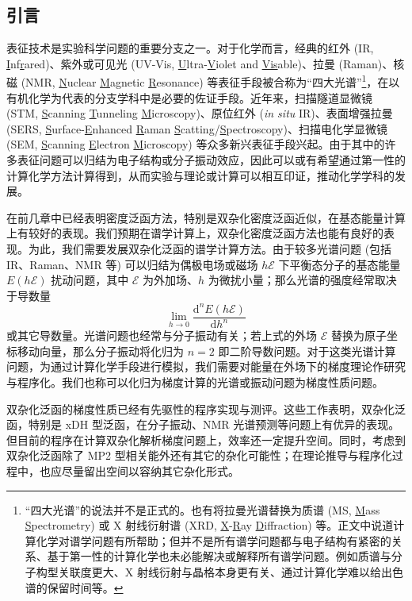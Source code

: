 \subsection{引言}

表征技术是实验科学问题的重要分支之一。对于化学而言，经典的红外 (IR, \underline{I}nf\underline{r}ared)、紫外或可见光 (UV-Vis, \underline{U}ltra-\underline{V}iolet and \underline{Vis}able)、拉曼 (Raman)、核磁 (NMR, \underline{N}uclear \underline{M}agnetic \underline{R}esonance) 等表征手段被合称为“四大光谱”\footnote{“四大光谱”的说法并不是正式的。也有将拉曼光谱替换为质谱 (MS, \underline{M}ass \underline{S}pectrometry) 或 X 射线衍射谱 (XRD, \underline{X}-\underline{R}ay \underline{D}iffraction) 等。正文中说道计算化学对谱学问题有所帮助；但并不是所有谱学问题都与电子结构有紧密的关系、基于第一性的计算化学也未必能解决或解释所有谱学问题。例如质谱与分子构型关联度更大、X 射线衍射与晶格本身更有关、通过计算化学难以给出色谱的保留时间等。}，在以有机化学为代表的分支学科中是必要的佐证手段。近年来，扫描隧道显微镜 (STM, \underline{S}canning \underline{T}unneling \underline{M}icroscopy)、原位红外 (\emph{in situ} IR)、表面增强拉曼 (SERS, \underline{S}urface-\underline{E}nhanced \underline{R}aman \underline{S}catting/\underline{S}pectroscopy)、扫描电化学显微镜 (SEM, \underline{S}canning \underline{E}lectron \underline{M}icroscopy) 等众多新兴表征手段兴起。由于其中的许多表征问题可以归结为电子结构或分子振动效应，因此可以或有希望通过第一性的计算化学方法计算得到，从而实验与理论或计算可以相互印证，推动化学学科的发展。

在前几章中已经表明密度泛函方法，特别是双杂化密度泛函近似，在基态能量计算上有较好的表现。我们预期在谱学计算上，双杂化密度泛函方法也能有良好的表现。为此，我们需要发展双杂化泛函的谱学计算方法。由于较多光谱问题 (包括 IR、Raman、NMR 等) 可以归结为偶极电场或磁场 $h \pmb{\mathcal{E}}$ 下平衡态分子的基态能量 $E(h \pmb{\mathcal{E}})$ 扰动问题，其中 $\pmb{\mathcal{E}}$ 为外加场、$h$ 为微扰小量；那么光谱的强度经常取决于导数量
\begin{equation}
  \lim_{h \rightarrow 0} \frac{\mathrm{d}^n E(h \pmb{\mathcal{E}})}{\mathrm{d} h^n}
\end{equation}
或其它导数量。光谱问题也经常与分子振动有关；若上式的外场 $\pmb{\mathcal{E}}$ 替换为原子坐标移动向量，那么分子振动将化归为 $n = 2$ 即二阶导数问题。对于这类光谱计算问题，为通过计算化学手段进行模拟，我们需要对能量在外场下的梯度理论作研究与程序化。我们也称可以化归为梯度计算的光谱或振动问题为\textsf{梯度性质}问题。

双杂化泛函的梯度性质已经有先驱性的程序实现与测评\cite{Neese-Grimme.JCP.2007, Biczysko-Barone.JCTC.2010, Su-Xu.JCC.2013, Stoychev-Neese.JCTC.2018, Gu-Xu.JCTC.2021, Yan-Xu.JCTC.2022}。这些工作表明，双杂化泛函，特别是 xDH 型泛函，在分子振动、NMR 光谱预测等问题上有优异的表现。但目前的程序在计算双杂化解析梯度问题上，效率还一定提升空间。同时，考虑到双杂化泛函除了 MP2 型相关能外还有其它的杂化可能性；在理论推导与程序化过程中，也应尽量留出空间以容纳其它杂化形式。

